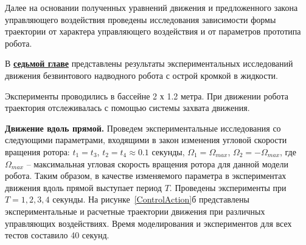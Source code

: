 
Далее на основании полученных уравнений движения и предложенного закона управляющего воздействия проведены исследования зависимости формы траектории от характера управляющего воздействия и от параметров прототипа робота. 











В \underline{\textbf{седьмой главе}} представлены результаты экспериментальных исследований движения безвинтового надводного робота с острой кромкой в жидкости.

Эксперименты проводились в бассейне 2 х 1.2 метра. При движении робота траектория отслеживалась с помощью системы захвата движения.%

\textbf{Движение вдоль прямой.} Проведем экспериментальные исследования со следующими параметрами, входящими в закон изменения угловой скорости вращения ротора: $t_1=t_3$, $ t_2 = t_4 \approx 0.1 $ секунды, $ \Omega_1 = \Omega_{max} $, $ \Omega_2 = -\Omega_{max} $, где $ \Omega_{max} $ -- максимальная угловая скорость вращения ротора для данной модели робота. Таким образом, в качестве изменяемого параметра в экспериментах движения вдоль прямой выступает период $T$. %
Проведены эксперименты при $ T = 1, 2, 3, 4 $ секунды. На рисунке~\ref{ControlAction}б представлены экспериментальные и расчетные траектории движения при различных управляющих воздействиях. 
Время моделирования и экспериментов для всех тестов составило 40 секунд. %

